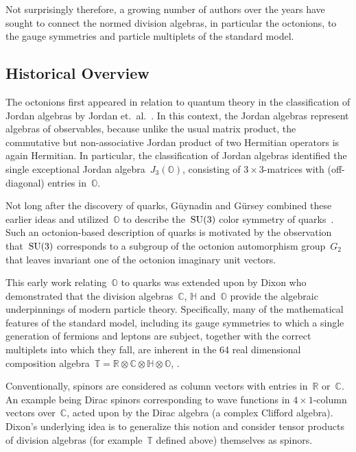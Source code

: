 \documentclass[reqno,11pt]{amsart}
\numberwithin{equation}{section}
\newcommand{\1}{\mbox{\rm 1 \hspace{-1.05 em} 1}}
\newcommand{\SU}{{\rm{SU}}}
\newcommand{\bb}[1]{\mathbb{#1}}
\begin{document}
Not surprisingly therefore, a growing number of authors over the years have sought to  connect the normed division algebras, in particular the octonions, to the gauge symmetries and particle multiplets of the standard model.


\subsection{Historical Overview}\label{historical}

The octonions first appeared in relation to quantum theory in the classification of Jordan algebras by Jordan et.\ al.~\cite{jordan1993algebraic}. In this context, the Jordan algebras represent algebras of observables, because unlike the usual matrix product, the commutative but non-associative Jordan product of two Hermitian operators is again Hermitian. In particular, the classification of Jordan algebras identified the single exceptional Jordan algebra~$J_3(\bb{O})$, consisting of $3\times 3$-matrices with (off-diagonal) entries in~$\bb{O}$. 

Not long after the discovery of quarks, G\"uynadin and G\"ursey combined these earlier ideas and utilized~$\bb{O}$ to describe the~$\SU(3)$ color symmetry of quarks~\cite{gunaydin1973quark}. Such an octonion-based description of quarks is motivated by the observation that~$\SU(3)$ corresponds to a subgroup of the octonion automorphism group~$G_2$ that leaves invariant one of the octonion imaginary unit vectors.

This early work relating~$\bb{O}$ to quarks was extended upon by Dixon who demonstrated that the division algebras~$\bb{C}$, $\bb{H}$ and~$\bb{O}$ provide the algebraic underpinnings of modern particle theory. Specifically, many of the mathematical features of the standard model, including its gauge symmetries to which a single generation of fermions and leptons are subject, together with the correct multiplets into which they fall, are inherent in the 64 real dimensional composition algebra~$\bb{T}=\mathbb{R}\otimes\mathbb{C}\otimes\mathbb{H}\otimes\mathbb{O}$,
\cite{dixon1990derivation,dixon19991,dixon1999algebraic,dixon2004division,dixon2010division,dixon2013division}.

Conventionally, spinors are considered as column vectors with entries in~$\bb{R}$ or~$\bb{C}$. An example being Dirac spinors corresponding to wave functions in $4\times 1$-column vectors over~$\bb{C}$, acted upon by the Dirac algebra (a complex Clifford algebra). Dixon's underlying idea is to generalize this notion and consider tensor products of division algebras (for example~$\bb{T}$ defined above) themselves as spinors.
\end{document}

